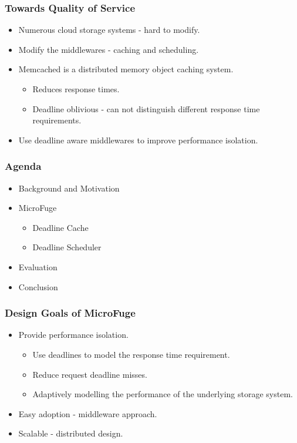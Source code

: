\documentclass{beamer}
\newcommand{\myv}{\vspace{3 mm}}
\begin{document}
\begin{frame}
  \frametitle{Towards Quality of Service}
  \begin{itemize}
    \item Numerous cloud storage systems - hard to modify.
      \myv
    \item Modify the middlewares - caching and scheduling.
      \myv
    \item Memcached is a distributed memory object caching system.
      \begin{itemize}
      \item Reduces response times.
      \item Deadline oblivious - can not distinguish different response time
        requirements.
      \end{itemize}
      \myv
    \item[\Checkmark] Use deadline aware middlewares to improve performance isolation.
  \end{itemize}

\end{frame}


\begin{frame}
  \frametitle{Agenda}
  \begin{itemize}
  \item[\Checkmark] Background and Motivation
  \item MicroFuge
    \begin{itemize}
    \item Deadline Cache
    \item Deadline Scheduler
    \end{itemize}
  \item Evaluation
  \item Conclusion
  \end{itemize}
\end{frame}


\begin{frame}
  \frametitle{Design Goals of MicroFuge}
  \vspace{-15 mm}
    \begin{itemize}
    \item Provide performance isolation.
      \begin{itemize}
        \myv
      \item Use deadlines to model the response time requirement.
        \myv
      \item Reduce request deadline misses.
        \myv
      \item Adaptively modelling the performance of the underlying storage
        system.
      \end{itemize}
    \myv
    \item Easy adoption - middleware approach.
      \myv
    \item Scalable - distributed design.
    \end{itemize}
\end {frame}
\end{document}
